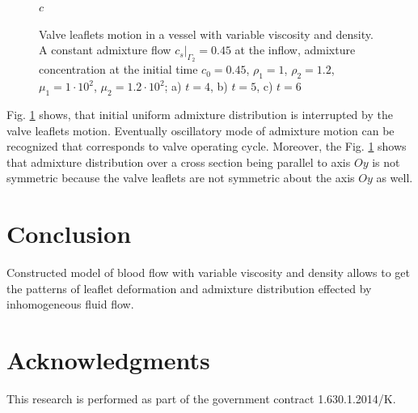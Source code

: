\documentclass[runningheads,a4paper]{llncs}
\begin{document}
\begin{figure}
$c$

\caption{Valve leaflets motion in a vessel with variable viscosity and density. A constant admixture flow $c_s|_{\Gamma_2} = 0.45$ at the inflow,
admixture concentration at the initial time $c_0 = 0.45$, $\rho_1=1$, $\rho_2=1.2$, $\mu_1 = 1 \cdot 10^2$, $\mu_2 = 1.2 \cdot 10^2$;
a) $t = 4$, b) $t=5$, c) $t=6$}
\label{fig:valve_in_mixture}
\end{figure}

Fig. \ref{fig:valve_in_mixture} shows, that initial uniform admixture distribution is interrupted by the valve leaflets motion. Eventually oscillatory mode of
admixture motion can be recognized that corresponds to valve operating cycle. 
Moreover, the Fig. \ref{fig:valve_in_mixture} shows that admixture distribution over a cross section being parallel to axis $Oy$
is not symmetric because the valve leaflets are not symmetric about the axis $Oy$ as well.

\section{Conclusion}

Constructed model of blood flow with variable viscosity and density allows to get the patterns of leaflet deformation and admixture distribution 
effected by inhomogeneous fluid flow.

\section*{Acknowledgments}
This research is performed as part of the government contract 1.630.1.2014/K.
\end{document}
